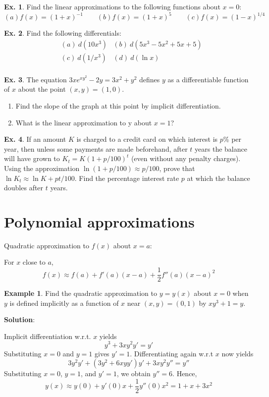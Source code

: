 \documentclass[10pt,a4paper]{book}
\theoremstyle{definition}\newtheorem{definition}{Definition}
\theoremstyle{definition}\newtheorem{fact}{Fact}
\theoremstyle{definition}\newtheorem{ex}{Ex.}
\theoremstyle{definition}\newtheorem{project}{Project}
\theoremstyle{definition}\newtheorem{problem}{Problem}
\theoremstyle{definition}\newtheorem{example}{Example}
\numberwithin{theorem}{chapter}
\numberwithin{corollary}{chapter}
\numberwithin{assumption}{chapter}
\numberwithin{definition}{chapter}
\numberwithin{prop}{chapter}
\numberwithin{notation}{chapter}
\numberwithin{problem}{chapter}
\numberwithin{example}{chapter}
\numberwithin{fact}{chapter}
\numberwithin{ex}{chapter}
\begin{document}
	\begin{ex}
		Find the linear approximations to the following functions about $x = 0$:
		\begin{equation*}
			(a) f(x) = (1+x)^{-1} \qquad
			(b) f(x) = (1+x)^5 \qquad
			(c) f(x) = (1-x)^{1/4}
		\end{equation*}
	\end{ex}
	
	\begin{ex}
		Find the following differentials:
		\begin{align*}
			& (a) \ d(10x^3)          
			& (b) \ d(5x^3-5x^2+5x+5) \\
			& (c) \ d(1/x^3)          
			& (d) \ d(\ln x)          \\
		\end{align*}
	\end{ex}
	
	\begin{ex}
		The equation $3xe^{xy^2} - 2y = 3x^2 + y^2$ defines $y$ as a differentiable function of $x$ about the point $(x, y) = (1, 0)$.
		\begin{enumerate}[label=(\alph*)]
			\item Find the slope of the graph at this point by implicit differentiation.
			\item What is the linear approximation to y about $x = 1$?
		\end{enumerate}
	\end{ex}
	
	\begin{ex}
		If an amount $K$ is charged to a credit card on which interest is $p$\% per year, then unless some payments are made beforehand, after $t$ years the balance will have grown to $K_t =K(1+p/100)^t$ (even without any penalty charges). Using the approximation $\ln(1 + p/100) \approx p/100$, prove that $\ln K_t \approx \ln K + pt/100$. Find the percentage interest rate $p$ at which the balance doubles after $t$ years.
	\end{ex}
	
	\section{Polynomial approximations}
	
	Quadratic approximation to $f(x)$ about $x=a$:
	
	For $x$ close to $a$,
	$$f(x) \approx f(a) + f'(a)(x-a) + \frac{1}{2}f''(a)(x-a)^2$$
	
	\begin{example}
		Find the quadratic approximation to $y = y(x)$ about $x = 0$ when $y$ is defined implicitly as a function of $x$ near $(x,y)=(0,1)$ by $xy^3 +1=y$.
		
		\textbf{Solution}:
		
		Implicit differentiation w.r.t. $x$ yields
		$$y^3+3xy^2y'=y'$$
		Substituting $x = 0$ and $y = 1$ gives $y' = 1$. Differentiating again w.r.t $x$ now yields
		$$3y^2y'+(3y^2+6xyy')y'+3xy^2y'' = y''$$
		Substituting $x = 0$, $y = 1$, and $y' = 1$, we obtain $y'' = 6$. Hence,
		$$y(x) \approx y(0)+y'(0)x+ \frac{1}{2}y''(0)x^2 =1+x+3x^2$$
	\end{example}
	
\end{document}
